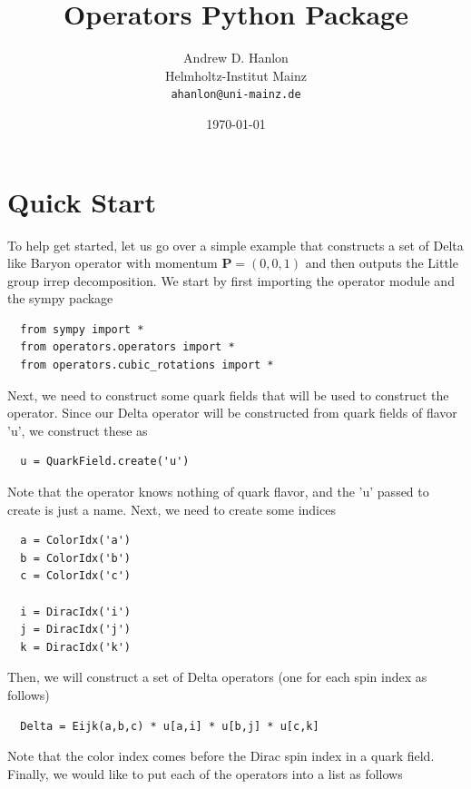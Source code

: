 \documentclass[12pt]{article}
\begin{document}
\title{\bf Operators Python Package}
\author{Andrew D. Hanlon\\
  Helmholtz-Institut Mainz\\
  \texttt{ahanlon@uni-mainz.de}}
\date{\today}
\maketitle


\section{Quick Start}

To help get started, let us go over a simple example that constructs a set of Delta like Baryon operator
with momentum $\bm{P} = (0,0,1)$ and then outputs the Little group irrep decomposition.
We start by first importing the operator module and the sympy package

\begin{lstlisting}
  from sympy import *
  from operators.operators import *
  from operators.cubic_rotations import *
\end{lstlisting}

Next, we need to construct some quark fields that will be used to construct the operator. Since our
Delta operator will be constructed from quark fields of flavor 'u', we construct these as

\begin{lstlisting}
  u = QuarkField.create('u')
\end{lstlisting}

Note that the operator knows nothing of quark flavor, and the 'u' passed to create is just a name.
Next, we need to create some indices

\begin{lstlisting}
  a = ColorIdx('a')
  b = ColorIdx('b')
  c = ColorIdx('c')

  i = DiracIdx('i')
  j = DiracIdx('j')
  k = DiracIdx('k')
\end{lstlisting}

Then, we will construct a set of Delta operators (one for each spin index as follows)

\begin{lstlisting}
  Delta = Eijk(a,b,c) * u[a,i] * u[b,j] * u[c,k]
\end{lstlisting}

Note that the color index comes before the Dirac spin index in a quark field.
Finally, we would like to put each of the operators into a list as follows
\end{document}
